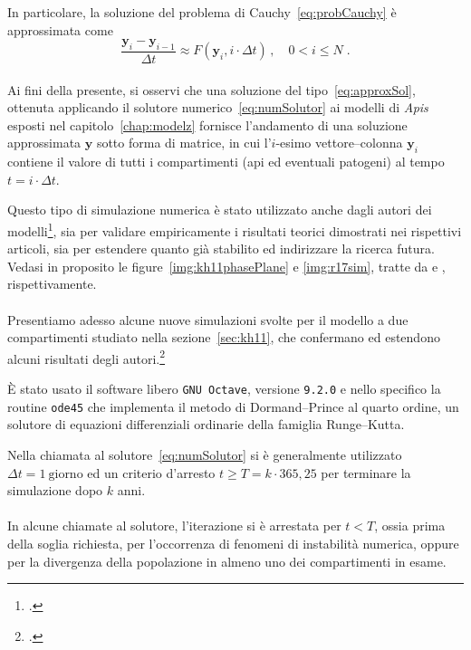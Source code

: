 In particolare, la soluzione del problema di Cauchy~\eqref{eq:probCauchy} è approssimata come
$$\frac{\mathbf{y}_i - \mathbf{y}_{i-1}}{\Delta t} \approx %
F \left( \mathbf{y}_i, i \cdot \Delta t \right) \, , \quad 0 < i \leq N \; .$$

\paragraph{}
Ai fini della presente, si osservi che una soluzione del tipo~\eqref{eq:approxSol}, ottenuta applicando il solutore
numerico~\eqref{eq:numSolutor} ai modelli di \emph{Apis} esposti nel capitolo~\ref{chap:modelz} fornisce l'andamento
di una soluzione approssimata $\mathbf{y}$ sotto forma di matrice, in cui l'$i$-esimo
vettore--colonna $\mathbf{y}_i$ contiene il valore di
tutti i compartimenti (api ed eventuali patogeni) al tempo $t = i \cdot \Delta t$.

Questo tipo di simulazione numerica è stato utilizzato anche dagli autori dei modelli\footcite{khoury2011,ratti2017},
sia per validare empiricamente i risultati teorici dimostrati nei rispettivi articoli, sia per estendere
quanto già stabilito ed indirizzare la ricerca futura. Vedasi in proposito le figure~\ref{img:kh11phasePlane} e
\ref{img:r17sim}, tratte da \cite{khoury2011} e \cite{ratti2017}, rispettivamente.

\paragraph{}
Presentiamo adesso alcune nuove simulazioni svolte per il modello a due compartimenti
studiato nella sezione~\ref{sec:kh11}, che confermano ed estendono alcuni risultati degli autori.\footcite{khoury2011}

È stato usato il software libero \texttt{GNU Octave}, versione \texttt{9.2.0} e nello specifico
la routine \texttt{ode45} che implementa il metodo di Dormand--Prince al quarto ordine, un solutore
di equazioni differenziali ordinarie della famiglia Runge--Kutta.

Nella chiamata al solutore~\eqref{eq:numSolutor} si è generalmente utilizzato $\Delta t=1~\text{giorno}$
ed un criterio d'arresto $t \geq T=k \cdot 365,25$ per terminare la simulazione dopo $k$ anni.

\paragraph{}
In alcune chiamate al solutore, l'iterazione si è arrestata per $t < T$, ossia prima della soglia richiesta, per
l'occorrenza di fenomeni di instabilità numerica, oppure per la divergenza della popolazione in almeno
uno dei compartimenti in esame.


